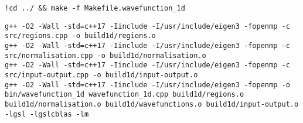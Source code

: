 \documentclass[11pt]{article}
\begin{document}
\begin{verbatim}
!cd ../ && make -f Makefile.wavefunction_1d
\end{verbatim}

\label{orgffbf6ac}
\begin{verbatim}
g++ -O2 -Wall -std=c++17 -Iinclude -I/usr/include/eigen3 -fopenmp -c src/regions.cpp -o build1d/regions.o
g++ -O2 -Wall -std=c++17 -Iinclude -I/usr/include/eigen3 -fopenmp -c src/normalisation.cpp -o build1d/normalisation.o
g++ -O2 -Wall -std=c++17 -Iinclude -I/usr/include/eigen3 -fopenmp -c src/input-output.cpp -o build1d/input-output.o
g++ -O2 -Wall -std=c++17 -Iinclude -I/usr/include/eigen3 -fopenmp -o bin/wavefunction_1d wavefunction_1d.cpp build1d/regions.o build1d/normalisation.o build1d/wavefunctions.o build1d/input-output.o -lgsl -lgslcblas -lm
\end{verbatim}
\end{document}
